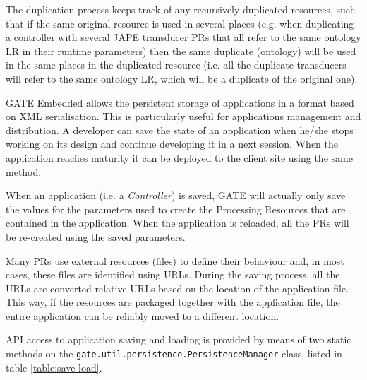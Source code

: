 The duplication process keeps track of any recursively-duplicated resources,
such that if the same original resource is used in several places (e.g.  when
duplicating a controller with several JAPE transducer PRs that all refer to the
same ontology LR in their runtime parameters) then the same duplicate
(ontology) will be used in the same places in the duplicated resource (i.e. all
the duplicate transducers will refer to the same ontology LR, which will be a
duplicate of the original one).


GATE Embedded allows the persistent storage of applications in a
format based on XML serialisation. This is particularly useful for
applications management and distribution. A developer can save the
state of an application when he/she stops working on its design and
continue developing it in a next session. When the application reaches
maturity it can be deployed to the client site using the same method.

When an application (i.e. a {\em Controller}) is saved, GATE
will actually only save the values for the parameters used to create
the Processing Resources that are contained in the application. When
the application is reloaded, all the PRs will be re-created using the
saved parameters.

Many PRs use external resources (files) to define their behaviour and, in most
cases, these files are identified using URLs. During the saving process, all
the URLs are converted relative URLs based on the location of the
application file. This way, if the resources are packaged together with the
application file, the entire application can be reliably moved to a
different location.

API access to application saving and loading is provided by means of two
static methods on the {\tt gate.util.persistence.PersistenceManager} class,
listed in table \ref{table:save-load}.

